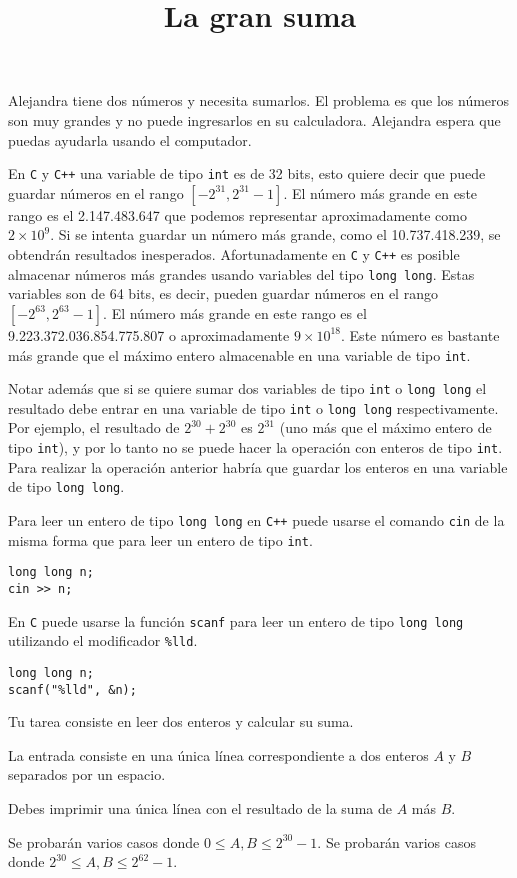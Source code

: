 \documentclass{oci}
\title{La gran suma}
\newcommand{\C}{\texttt{C}\xspace}
\newcommand{\Cpp}{\texttt{C++}\xspace}
\newcommand{\Int}{\texttt{int}\xspace}
\newcommand{\Long}{\texttt{long long}\xspace}
\newcommand{\cin}{\texttt{cin}\xspace}
\newcommand{\scanf}{\texttt{scanf}\xspace}
\begin{document}
\begin{problemDescription}
  Alejandra tiene dos números y necesita sumarlos.
El problema es que los números son muy grandes y no puede ingresarlos en su calculadora.
Alejandra espera que puedas ayudarla usando el computador.

En \C y \Cpp una variable de tipo \Int es de 32 bits, esto quiere decir que puede guardar números en el rango $[-2^{31}, 2^{31}-1]$.
El número más grande en este rango es el 2.147.483.647 que podemos representar aproximadamente como $2\times 10^9$.
Si se intenta guardar un número más grande, como el 10.737.418.239, se obtendrán resultados inesperados.
Afortunadamente en \C y \Cpp es posible almacenar números más grandes usando variables del tipo \Long.
Estas variables son de 64 bits, es decir, pueden guardar números en el rango $[-2^{63}, 2^{63}-1]$.
El número más grande en este rango es el 9.223.372.036.854.775.807 o aproximadamente $9\times 10^{18}$.
Este número es bastante más grande que el máximo entero almacenable en una variable de tipo \Int.

Notar además que si se quiere sumar dos variables de tipo \Int o \Long el resultado debe entrar en una variable de tipo \Int o \Long respectivamente.
Por ejemplo, el resultado de $2^{30}+2^{30}$ es $2^{31}$ (uno más que el máximo entero de tipo \Int), y por lo tanto no se puede hacer la operación con enteros de tipo \Int.
Para realizar la operación anterior habría que guardar los enteros en una variable de tipo \Long.

Para leer un entero de tipo \Long en \Cpp puede usarse el comando \cin de la misma forma que para leer un entero de tipo \Int.
\begin{verbatim}
long long n;
cin >> n;
\end{verbatim}

En \C puede usarse la función \scanf para leer un entero de tipo \Long utilizando el modificador \texttt{\%lld}.
\begin{verbatim}
long long n;
scanf("%lld", &n);
\end{verbatim}

Tu tarea consiste en leer dos enteros y calcular su suma.
  
\end{problemDescription}

\begin{inputDescription}
  La entrada consiste en una única línea correspondiente a dos enteros $A$ y $B$ separados por un espacio.
\end{inputDescription}

\begin{outputDescription}
  Debes imprimir una única línea con el resultado de la suma de $A$ más $B$.
\end{outputDescription}

\begin{scoreDescription}
   Se probarán varios casos donde $0\leq A,B \leq 2^{30}-1$.
   Se probarán varios casos donde $2^{30}\leq A,B \leq 2^{62}-1$.
\end{scoreDescription}

\begin{sampleDescription}
\end{sampleDescription}
\end{document}
